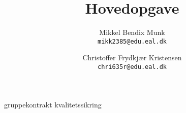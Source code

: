 \documentclass[a4paper, 11pt, danish]{report}
\title{Hovedopgave}
\author{
    Mikkel Bendix Munk\\
    \texttt{mikk2385@edu.eal.dk}
    \and
    Christoffer Frydkjær Kristensen\\
    \texttt{chri635r@edu.eal.dk}
}
\begin{document}
\maketitle
\tableofcontents{}
\newpage
%
%
%
{gruppekontrakt}
{kvalitetssikring}

%
%
\end{document}
